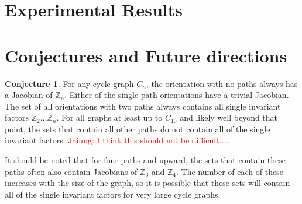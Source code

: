 \documentclass[11pt,reqno]{amsart}
\theoremstyle{definition}
\newtheorem{conj}[mydef]{Conjecture}
\theoremstyle{plain}
\begin{document}
\section{Experimental Results}


\section{Conjectures and Future directions}

	\begin{conj}
	For any cycle graph $C_n$, the orientation with no paths always has a Jacobian of $\mathbb{Z}_n$.
	Either of the single path orientations have a trivial Jacobian.
	The set of all orientations with two paths always contains all single invariant factors
	$\mathbb{Z}_2\dots\mathbb{Z}_n$.  For all graphs at least up to $C_{10}$ and likely well beyond that
	point, the sets that contain all other paths do not contain all of the single invariant factors. \textcolor{red}{Jaiung: I think this should not be difficult....}
\end{conj}

It should be noted that for four paths and upward, the sets that contain these paths often also contain
Jacobians of $\mathbb{Z}_3$ and $\mathbb{Z}_4$.  The number of each of these increases with the size of the
graph, so it is possible that these sets will contain all of the single invariant factors for very
large cycle graphs.



\end{document}
